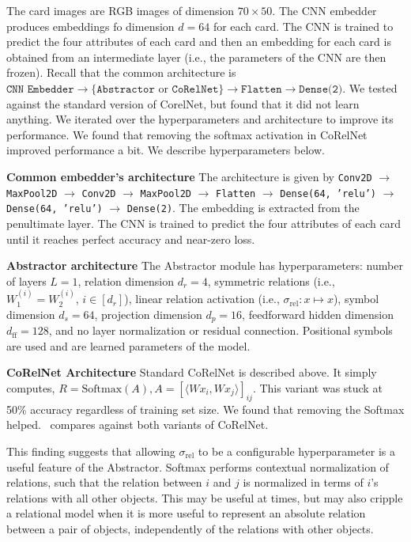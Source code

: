 The card images are RGB images of dimension $70 \times 50$. The CNN embedder produces embeddings fo dimension $d=64$ for each card. The CNN is trained to predict the four attributes of each card and then an embedding for each card is obtained from an intermediate layer (i.e., the parameters of the CNN are then frozen). Recall that the common architecture is $\texttt{CNN Embedder} \to \{\texttt{Abstractor} \text{ or } \texttt{CoRelNet}\} \to \texttt{Flatten} \to \texttt{Dense(2)}$. We tested against the standard version of CorelNet, but found that it did not learn anything. We iterated over the hyperparameters and architecture to improve its performance. We found that removing the softmax activation in CoRelNet improved performance a bit. We describe hyperparameters below.

\textbf{Common embedder's architecture} The architecture is given by \texttt{Conv2D} $\to$ \texttt{MaxPool2D} $\to$ \texttt{Conv2D} $\to$ \texttt{MaxPool2D} $\to$ \texttt{Flatten} $\to$ \texttt{Dense(64, 'relu')} $\to$ \texttt{Dense(64, 'relu')} $\to$ \texttt{Dense(2)}. The embedding is extracted from the penultimate layer. The CNN is trained to predict the four attributes of each card until it reaches perfect accuracy and near-zero loss.

\textbf{Abstractor architecture}
The Abstractor module has hyperparameters: number of layers $L = 1$, relation dimension $d_r = 4$, symmetric relations (i.e., $W_1^{(i)} = W_2^{(i)}$, $i \in [d_r]$), linear relation activation (i.e., $\sigma_{\mathrm{rel}}: x \mapsto x$), symbol dimension $d_s = 64$, projection dimension $d_p = 16$, feedforward hidden dimension $d_{\mathrm{ff}} = 128$, and no layer normalization or residual connection. Positional symbols are used  and are learned parameters of the model.

\textbf{CoRelNet Architecture} Standard CoRelNet is described above. It simply computes, $R = \text{Softmax}(A), A = {\left[\langle W x_i, W x_j\rangle\right]}_{ij}$. This variant was stuck at 50\% accuracy regardless of training set size. We found that removing the Softmax helped.~ compares against both variants of CoRelNet.

This finding suggests that allowing $\sigma_{\mathrm{rel}}$ to be a configurable hyperparameter is a useful feature of the Abstractor. Softmax performs contextual normalization of relations, such that the relation between $i$ and $j$ is normalized in terms of $i$'s relations with all other objects. This may be useful at times, but may also cripple a relational model when it is more useful to represent an absolute relation between a pair of objects, independently of the relations with other objects.

